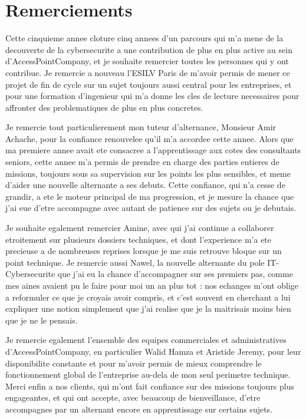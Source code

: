 \documentclass[11pt,a4paper]{article}
\begin{document}
\tableofcontents
\newpage

\section*{Remerciements}

Cette cinquieme annee cloture cinq annees d'un parcours qui m'a mene de la decouverte de la cybersecurite a une contribution de plus en plus active au sein d'AccessPointCompany, et je souhaite remercier toutes les personnes qui y ont contribue. Je remercie a nouveau l'ESILV Paris de m'avoir permis de mener ce projet de fin de cycle sur un sujet toujours aussi central pour les entreprises, et pour une formation d'ingenieur qui m'a donne les cles de lecture necessaires pour affronter des problematiques de plus en plus concretes.

Je remercie tout particulierement mon tuteur d'alternance, Monsieur Amir Achache, pour la confiance renouvelee qu'il m'a accordee cette annee. Alors que ma premiere annee avait ete consacree a l'apprentissage aux cotes des consultants seniors, cette annee m'a permis de prendre en charge des parties entieres de missions, toujours sous sa supervision sur les points les plus sensibles, et meme d'aider une nouvelle alternante a ses debuts. Cette confiance, qui n'a cesse de grandir, a ete le moteur principal de ma progression, et je mesure la chance que j'ai eue d'etre accompagne avec autant de patience sur des sujets ou je debutais.

Je souhaite egalement remercier Amine, avec qui j'ai continue a collaborer etroitement sur plusieurs dossiers techniques, et dont l'experience m'a ete precieuse a de nombreuses reprises lorsque je me suis retrouve bloque sur un point technique. Je remercie aussi Nawel, la nouvelle alternante du pole IT-Cybersecurite que j'ai eu la chance d'accompagner sur ses premiers pas, comme mes aines avaient pu le faire pour moi un an plus tot : nos echanges m'ont oblige a reformuler ce que je croyais avoir compris, et c'est souvent en cherchant a lui expliquer une notion simplement que j'ai realise que je la maitrisais moins bien que je ne le pensais.

Je remercie egalement l'ensemble des equipes commerciales et administratives d'AccessPointCompany, en particulier Walid Hamza et Aristide Jeremy, pour leur disponibilite constante et pour m'avoir permis de mieux comprendre le fonctionnement global de l'entreprise au-dela de mon seul perimetre technique. Merci enfin a nos clients, qui m'ont fait confiance sur des missions toujours plus engageantes, et qui ont accepte, avec beaucoup de bienveillance, d'etre accompagnes par un alternant encore en apprentissage sur certains sujets.
\end{document}
